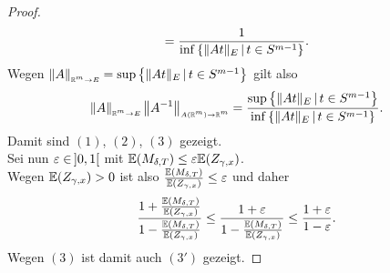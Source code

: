 \begin{proof}
\[= \frac 1 {\inf\left\{\lVert At\rVert_E\,|\,t \in S^{m-1}\right\}}\text.\]
Wegen $\left\|A\right\|_{\scriptscriptstyle{\ensuremath{\mathbb{R}}^m \rightarrow E}} = \sup\left\{\lVert At\rVert_E\,|\,t \in S^{m-1}\right\}$ gilt also
\[\left\|A\right\|_{\scriptscriptstyle{\ensuremath{\mathbb{R}}^m \rightarrow E}} \left\|A^{-1}\right\|_{\scriptscriptstyle{A(\ensuremath{\mathbb{R}}^m) \rightarrow \ensuremath{\mathbb{R}}^m}}
= \frac{\sup\left\{\lVert At\rVert_E\,|\,t \in S^{m-1}\right\}}
       {\inf\left\{\lVert At\rVert_E\,|\,t \in S^{m-1}\right\}}\text.\]
Damit sind $(1)$, $(2)$, $(3)$ gezeigt.\\
Sei nun $\varepsilon\in\!\ ]0, 1[$ mit $\mathbb{E}(M_{\delta, T})\le \varepsilon \mathbb{E}(Z_{\gamma,x})$.\\
Wegen $\mathbb{E}(Z_{\gamma,x}) > 0$ ist also 
$\frac{\mathbb{E}(M_{\delta, T})}{\mathbb{E}(Z_{\gamma,x})} \le \varepsilon$ und daher
\[\frac{1 + \frac{\mathbb{E}(M_{\delta, T})}{\mathbb{E}(Z_{\gamma,x})}}
       {1 - \frac{\mathbb{E}(M_{\delta, T})}{\mathbb{E}(Z_{\gamma,x})}}
\le \frac{1 + \varepsilon}{1 - \frac{\mathbb{E}(M_{\delta, T})}{\mathbb{E}(Z_{\gamma,x})}}
\le \frac{1 + \varepsilon}{1 - \varepsilon} \text.\]
Wegen $(3)$ ist damit auch $(3')$ gezeigt.
\end{proof}